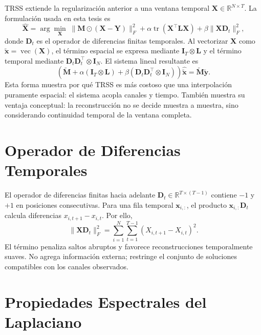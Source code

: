 TRSS extiende la regularización anterior a una ventana temporal $\mathbf{X}\in\mathbb{R}^{N\times T}$. La formulación usada en esta tesis es
\begin{equation}
\hat{\mathbf{X}}=\arg\min_{\mathbf{X}}\; \|\mathbf{M}\odot(\mathbf{X}-\mathbf{Y})\|_F^2 + \alpha\operatorname{tr}(\mathbf{X}^{\top}\mathbf{L}\mathbf{X}) + \beta\|\mathbf{X}\mathbf{D}_t\|_F^2,
\end{equation}
donde $\mathbf{D}_t$ es el operador de diferencias finitas temporales. Al vectorizar $\mathbf{X}$ como $\tilde{\mathbf{x}}=\operatorname{vec}(\mathbf{X})$, el término espacial se expresa mediante $\mathbf{I}_T\otimes\mathbf{L}$ y el término temporal mediante $\mathbf{D}_t\mathbf{D}_t^{\top}\otimes\mathbf{I}_N$. El sistema lineal resultante es
\begin{equation}
\left(\tilde{\mathbf{M}} + \alpha(\mathbf{I}_T\otimes\mathbf{L}) + \beta(\mathbf{D}_t\mathbf{D}_t^{\top}\otimes\mathbf{I}_N)\right)\hat{\tilde{\mathbf{x}}}=\tilde{\mathbf{M}}\tilde{\mathbf{y}}.
\end{equation}
Esta forma muestra por qué TRSS es más costoso que una interpolación puramente espacial: el sistema acopla canales y tiempo. También muestra su ventaja conceptual: la reconstrucción no se decide muestra a muestra, sino considerando continuidad temporal de la ventana completa.

\section{Operador de Diferencias Temporales}

El operador de diferencias finitas hacia adelante $\mathbf{D}_t\in\mathbb{R}^{T\times(T-1)}$ contiene $-1$ y $+1$ en posiciones consecutivas. Para una fila temporal $\mathbf{x}_{i,:}$, el producto $\mathbf{x}_{i,:}\mathbf{D}_t$ calcula diferencias $x_{i,t+1}-x_{i,t}$. Por ello,
\begin{equation}
\|\mathbf{X}\mathbf{D}_t\|_F^2 = \sum_{i=1}^{N}\sum_{t=1}^{T-1}(X_{i,t+1}-X_{i,t})^2.
\end{equation}
El término penaliza saltos abruptos y favorece reconstrucciones temporalmente suaves. No agrega información externa; restringe el conjunto de soluciones compatibles con los canales observados.

\section{Propiedades Espectrales del Laplaciano}


